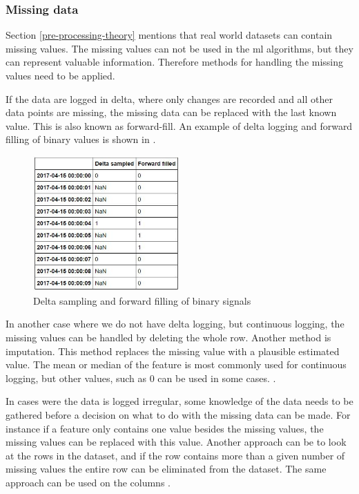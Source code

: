 \documentclass[english, a4paper]{report}
\begin{document}
{{{            \subsubsection{Missing data}\label{missingData}
            {
                Section \ref{pre-processing-theory} mentions that real world datasets can contain missing values. The missing values can not be used in the \gls{ml} algorithms, but they can represent valuable information. Therefore methods for handling the missing values need to be applied.
                \par
                If the data are logged in delta, where only changes are recorded and all other data points are missing, the missing data can be replaced with the last known value. This is also known as forward-fill. An example of delta logging and forward filling of binary values is shown in .
                \begin{figure}[H]
                    \centering \includegraphics[width=0.5\textwidth]{deltaLogging}
                    \caption{Delta sampling and forward filling of binary signals}
                    \label{fig:deltaLogging}
                \end{figure}
                \par                
                In another case where we do not have delta logging, but continuous logging, the missing values can be handled by deleting the whole row. Another method is imputation. This method replaces the missing value with a plausible estimated value. The mean or median of the feature is most commonly used for continuous logging, but other values, such as 0 can be used in some cases. \cite{mlKelleher}.
                \par
                In cases were the data is logged irregular, some knowledge of the data needs to be gathered before a decision on what to do with the missing data can be made. For instance if a feature only contains one value besides the missing values, the missing values can be replaced with this value. Another approach can be to look at the rows in the dataset, and if the row contains more than a given number of missing values the entire row can be eliminated from the dataset. The same approach can be used on the columns \cite{supervisedMLsecom}.
            }
            
}}}
\end{document}
